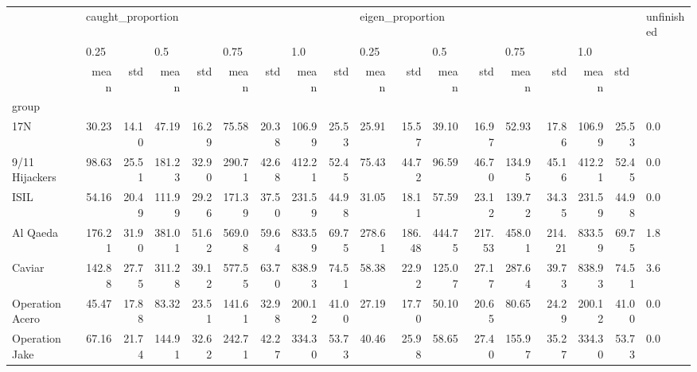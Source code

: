 \begin{tabular}{lrrrrrrrrrrrrrrrrl}
\toprule
{} & \multicolumn{8}{l}{caught\_proportion} & \multicolumn{8}{l}{eigen\_proportion} & unfinished \\
{} & \multicolumn{2}{l}{0.25} & \multicolumn{2}{l}{0.5} & \multicolumn{2}{l}{0.75} & \multicolumn{2}{l}{1.0} & \multicolumn{2}{l}{0.25} & \multicolumn{2}{l}{0.5} & \multicolumn{2}{l}{0.75} & \multicolumn{3}{l}{1.0} \\
{} &              mean &    std &    mean &    std &    mean &    std &    mean &    std &             mean &     std &    mean &     std &    mean &     std &    mean & \multicolumn{2}{l}{std} \\
group                &                   &        &         &        &         &        &         &        &                  &         &         &         &         &         &         &        &            \\
\midrule
17N                  &             30.23 &  14.10 &   47.19 &  16.29 &   75.58 &  20.38 &  106.99 &  25.53 &            25.91 &   15.57 &   39.10 &   16.97 &   52.93 &   17.86 &  106.99 &  25.53 &        0.0 \\
9/11 Hijackers       &             98.63 &  25.51 &  181.23 &  32.90 &  290.71 &  42.68 &  412.21 &  52.45 &            75.43 &   44.72 &   96.59 &   46.70 &  134.95 &   45.16 &  412.21 &  52.45 &        0.0 \\
ISIL                 &             54.16 &  20.49 &  111.99 &  29.26 &  171.39 &  37.50 &  231.59 &  44.98 &            31.05 &   18.11 &   57.59 &   23.12 &  139.72 &   34.35 &  231.59 &  44.98 &        0.0 \\
Al Qaeda             &            176.21 &  31.90 &  381.01 &  51.62 &  569.08 &  59.64 &  833.59 &  69.75 &           278.61 &  186.48 &  444.75 &  217.53 &  458.01 &  214.21 &  833.59 &  69.75 &        1.8 \\
Caviar               &            142.88 &  27.75 &  311.28 &  39.12 &  577.55 &  63.70 &  838.93 &  74.51 &            58.38 &   22.92 &  125.07 &   27.17 &  287.64 &   39.73 &  838.93 &  74.51 &        3.6 \\
Operation Acero      &             45.47 &  17.88 &   83.32 &  23.51 &  141.61 &  32.98 &  200.12 &  41.00 &            27.19 &   17.70 &   50.10 &   20.65 &   80.65 &   24.29 &  200.12 &  41.00 &        0.0 \\
Operation Jake       &             67.16 &  21.74 &  144.91 &  32.62 &  242.71 &  42.27 &  334.30 &  53.73 &            40.46 &   25.98 &   58.65 &   27.40 &  155.97 &   35.27 &  334.30 &  53.73 &        0.0 \\

\end{tabular}
